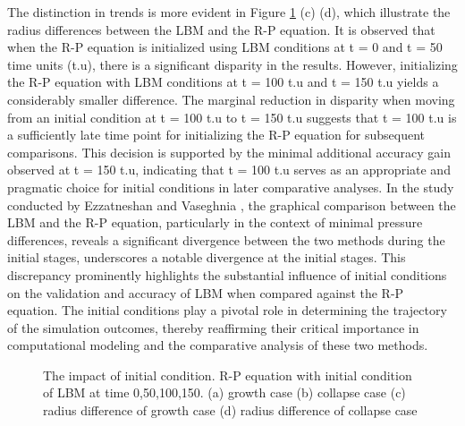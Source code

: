 \documentclass[review]{elsarticle}
\begin{document}
The distinction in trends is more evident in Figure \ref{fig:initial} (c) (d), which illustrate the radius differences between the LBM and the R-P equation. It is observed that when the R-P equation is initialized using LBM conditions at t = 0 and t = 50 time units (t.u), there is a significant disparity in the results. However, initializing the R-P equation with LBM conditions at t = 100 t.u and t = 150 t.u yields a considerably smaller difference. The marginal reduction in disparity when moving from an initial condition at t = 100 t.u to t = 150 t.u suggests that t = 100 t.u is a sufficiently late time point for initializing the R-P equation for subsequent comparisons. This decision is supported by the minimal additional accuracy gain observed at t = 150 t.u, indicating that t = 100 t.u serves as an appropriate and pragmatic choice for initial conditions in later comparative analyses. In the study conducted by Ezzatneshan and Vaseghnia \cite{ezzatneshan2020simulation}, the graphical comparison between the LBM and the R-P equation, particularly in the context of minimal pressure differences, reveals a significant divergence between the two methods during the initial stages, underscores a notable divergence at the initial stages. This discrepancy prominently highlights the substantial influence of initial conditions on the validation and accuracy of LBM when compared against the R-P equation. The initial conditions play a pivotal role in determining the trajectory of the simulation outcomes, thereby reaffirming their critical importance in computational modeling and the comparative analysis of these two methods.  
\setlength{\abovecaptionskip}{10pt} %
\begin{figure}[htp!]
	\centering
	\setlength{}
	\setlength{}
	\caption{The impact of initial condition. R-P equation with initial condition of LBM at time 0,50,100,150. (a) growth case (b) collapse case (c) radius difference of growth case (d) radius difference of collapse case }
	\label{fig:initial}
\end{figure}
\newpage
\end{document}
